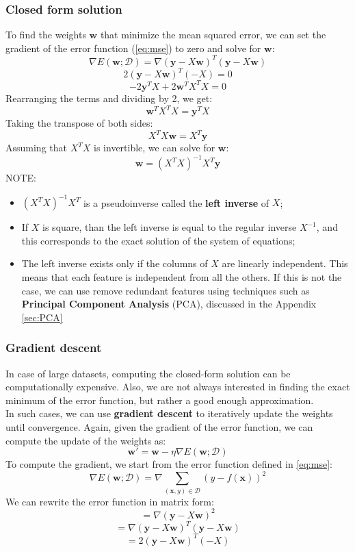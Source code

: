 \subsubsection{Closed form solution}
To find the weights $\boldsymbol{w}$ that minimize the mean squared error, we can set the gradient 
of the error function (\ref{eq:mse}) to zero and solve for $\boldsymbol{w}$:
\[\nabla E(\boldsymbol{w}; \mathcal{D}) = \nabla (\boldsymbol{y} - X\boldsymbol{w})^T (\boldsymbol{y} - X\boldsymbol{w})\]
\[ 2(\boldsymbol{y} - X\boldsymbol{w})^T (-X) = 0\]
\[-2\boldsymbol{y}^TX + 2\boldsymbol{w}^T X^T X = 0\]
Rearranging the terms and dividing by 2, we get:
\[\boldsymbol{w}^T X^T X = \boldsymbol{y}^T X\]
Taking the transpose of both sides:
\[X^T X \boldsymbol{w} = X^T \boldsymbol{y}\]
Assuming that $X^T X$ is invertible, we can solve for $\boldsymbol{w}$:
\begin{equation}
    \boldsymbol{w} = (X^T X)^{-1} X^T \boldsymbol{y}
\end{equation}
NOTE:
\begin{itemize}
    \item $(X^T X)^{-1} X^T$ is a pseudoinverse called the \textbf{left inverse} of $X$;
    \item If $X$ is square, than the left inverse is equal to the regular inverse $X^{-1}$, and this corresponds to the exact solution of the system of equations;
    \item The left inverse exists only if the columns of $X$ are linearly independent. 
    This means that each feature is independent from all the others.
    If this is not the case, we can use remove redundant features using techniques such as
    \textbf{Principal Component Analysis} (PCA), discussed in the Appendix \ref{sec:PCA}
\end{itemize}

\subsubsection{Gradient descent}
In case of large datasets, computing the closed-form solution can be computationally expensive.
Also, we are not always interested in finding the exact minimum of the error function, but rather a good enough approximation. 
\\In such cases, we can use \textbf{gradient descent} to iteratively update the weights until convergence.
Again, given the gradient of the error function, we can compute the update of the weights as:
\[\boldsymbol{w}' = \boldsymbol{w} - \eta \nabla E(\boldsymbol{w}; \mathcal{D})\]
To compute the gradient, we start from the error function defined in \eqref{eq:mse}:
\[ \nabla E(\boldsymbol{w}; \mathcal{D}) = \nabla \sum_{(\boldsymbol{x}, y) \in \mathcal{D}} (y - f(\boldsymbol{x}))^2  \]
We can rewrite the error function in matrix form:
\[ = \nabla (\boldsymbol{y} - X\boldsymbol{w})^2 \] 
\[= \nabla (\boldsymbol{y} - X\boldsymbol{w})^T (\boldsymbol{y} - X\boldsymbol{w})\]
\[ = 2(\boldsymbol{y} - X\boldsymbol{w})^T (-X) \]